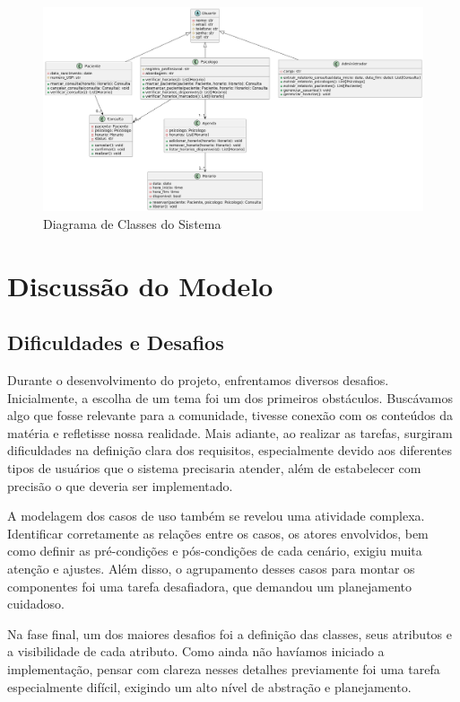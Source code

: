 \documentclass[a4paper,12pt]{report}
\begin{document}
\begin{figure}[h!]
    \centering
    \includegraphics[width=1.0\linewidth]{diagrama_de_classes.png}
    \caption{Diagrama de Classes do Sistema}
    \label{fig:enter-label}
\end{figure}

\section{Discussão do Modelo}

\subsection{Dificuldades e Desafios}

Durante o desenvolvimento do projeto, enfrentamos diversos desafios. Inicialmente, a escolha de um tema foi um dos primeiros obstáculos. Buscávamos algo que fosse relevante para a comunidade, tivesse conexão com os conteúdos da matéria e refletisse nossa realidade. Mais adiante, ao realizar as tarefas, surgiram dificuldades na definição clara dos requisitos, especialmente devido aos diferentes tipos de usuários que o sistema precisaria atender, além de estabelecer com precisão o que deveria ser implementado.

A modelagem dos casos de uso também se revelou uma atividade complexa. Identificar corretamente as relações entre os casos, os atores envolvidos, bem como definir as pré-condições e pós-condições de cada cenário, exigiu muita atenção e ajustes. Além disso, o agrupamento desses casos para montar os componentes foi uma tarefa desafiadora, que demandou um planejamento cuidadoso.

Na fase final, um dos maiores desafios foi a definição das classes, seus atributos e a visibilidade de cada atributo. Como ainda não havíamos iniciado a implementação, pensar com clareza nesses detalhes previamente foi uma tarefa especialmente difícil, exigindo um alto nível de abstração e planejamento.
\end{document}
